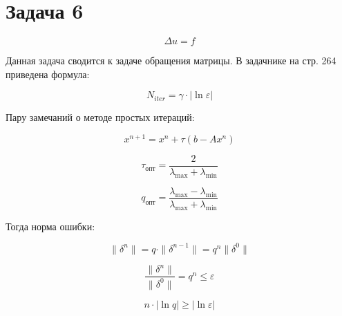 \documentclass[10pt,a4paper]{article}
\begin{document}
		\section{Задача 6}
		
		\begin{equation}
			\Delta u = f
		\end{equation}
		
		Данная задача сводится к задаче обращения матрицы. В задачнике на стр.
		264 приведена формула:
		
		\begin{equation}
			N_{iter} = \gamma\cdot\left|\ln\varepsilon\right|
		\end{equation}
		
		Пару замечаний о методе простых итераций:
		
		\begin{equation}
			x^{n + 1} = x^{n} + \tau\left(b - Ax^{n}\right)
		\end{equation}
		
		\begin{equation}
			\tau_{\text{опт}} = \frac{2}{\lambda_{\max} + \lambda_{\min}}
		\end{equation}
		
		\begin{equation}
			q_{\text{опт}} = \frac{\lambda_{\max} - \lambda_{\min}}
			{\lambda_{\max} + \lambda_{\min}}
		\end{equation}
		
		Тогда норма ошибки:
		
		\begin{equation}
			\parallel \delta^{n}\parallel = q\cdot\parallel\delta^{n - 1}
			\parallel = q^{n}\parallel\delta^{0}\parallel
		\end{equation}
		
		\begin{equation}
			\frac{\parallel\delta^{n}\parallel}{\parallel\delta^{0}\parallel}
			=q^{n}\leqslant \varepsilon
		\end{equation}
		
		\begin{equation}
			n\cdot\left|\ln q\right| \geqslant  \left|\ln\varepsilon\right|
		\end{equation}
\end{document}
